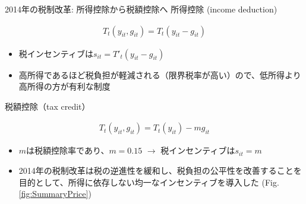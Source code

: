 \documentclass[
  ignorenonframetext,
  aspectratio=169,
]{beamer}
\providecommand{\tightlist}{%
  \setlength{\itemsep}{0pt}\setlength{\parskip}{0pt}}
\begin{document}
\begin{frame}{2014年の税制改革: 所得控除から税額控除へ}
\protect\hypertarget{ux5e74ux306eux7a0eux5236ux6539ux9769-ux6240ux5f97ux63a7ux9664ux304bux3089ux7a0eux984dux63a7ux9664ux3078}{}
所得控除 (income deduction)

\begin{align}
  T_t(y_{it}, g_{it}) = T_t(y_{it} - g_{it})
\end{align}

\begin{itemize}
\tightlist
\item
  税インセンティブは\(s_{it} = T'_t(y_{it} - g_{it})\)
\item
  高所得であるほど税負担が軽減される（限界税率が高い）ので、低所得より高所得の方が有利な制度
\end{itemize}

税額控除（tax credit）

\begin{align}
  T_t(y_{it}, g_{it}) = T_t(y_{it}) - m g_{it}
\end{align}

\begin{itemize}
\tightlist
\item
  \(m\)は税額控除率であり、\(m = 0.15\) \(\to\) 税インセンティブは\(s_{it} = m\)
\item
  2014年の税制改革は税の逆進性を緩和し、税負担の公平性を改善することを目的として、所得に依存しない均一なインセンティブを導入した (Fig. \ref{fig:SummaryPrice})
\end{itemize}
\end{frame}
\end{document}
